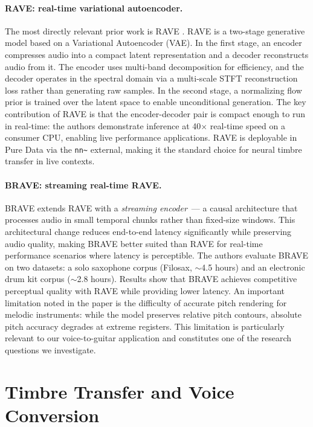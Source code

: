 \paragraph{RAVE: real-time variational autoencoder.}
The most directly relevant prior work is RAVE \cite{caillon2021rave}. RAVE is a two-stage generative model based on a Variational Autoencoder (VAE). In the first stage, an encoder compresses audio into a compact latent representation and a decoder reconstructs audio from it. The encoder uses multi-band decomposition for efficiency, and the decoder operates in the spectral domain via a multi-scale STFT reconstruction loss rather than generating raw samples. In the second stage, a normalizing flow prior is trained over the latent space to enable unconditional generation. The key contribution of RAVE is that the encoder-decoder pair is compact enough to run in real-time: the authors demonstrate inference at 40$\times$ real-time speed on a consumer CPU, enabling live performance applications. RAVE is deployable in Pure Data via the \texttt{nn\textasciitilde} external, making it the standard choice for neural timbre transfer in live contexts.

\paragraph{BRAVE: streaming real-time RAVE.}
BRAVE \cite{caspe2025brave} extends RAVE with a \emph{streaming encoder}~--- a causal architecture that processes audio in small temporal chunks rather than fixed-size windows. This architectural change reduces end-to-end latency significantly while preserving audio quality, making BRAVE better suited than RAVE for real-time performance scenarios where latency is perceptible. The authors evaluate BRAVE on two datasets: a solo saxophone corpus (Filosax, $\sim$4.5 hours) and an electronic drum kit corpus ($\sim$2.8 hours). Results show that BRAVE achieves competitive perceptual quality with RAVE while providing lower latency. An important limitation noted in the paper is the difficulty of accurate pitch rendering for melodic instruments: while the model preserves relative pitch contours, absolute pitch accuracy degrades at extreme registers. This limitation is particularly relevant to our voice-to-guitar application and constitutes one of the research questions we investigate.

\section{Timbre Transfer and Voice Conversion}
\label{sec:sota_timbre}

